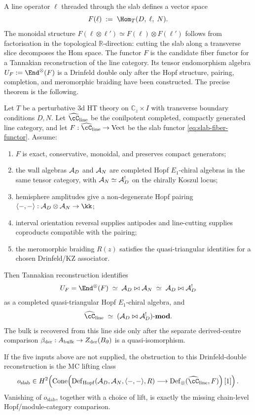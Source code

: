 A line operator $\ell$ threaded through the slab defines a vector
space
\begin{equation}\label{eq:slab-fiber-functor}
F(\ell) \;:=\; \Hom_T(D,\; \ell,\; N).
\end{equation}
The monoidal structure
$F(\ell \otimes \ell') \simeq F(\ell) \otimes F(\ell')$
follows from factorisation in the topological $\mathbb{R}$-direction:
cutting the slab along a transverse slice decomposes the Hom space.
The functor $F$ is the candidate fiber functor for a Tannakian
reconstruction of the line category. Its tensor endomorphism algebra
$U_F:=\End^\otimes(F)$ is a Drinfeld double only after the Hopf
structure, pairing, completion, and meromorphic braiding have been
constructed. The precise theorem is the following.

\begin{theorem}
\label{thm:slab-hopf-reconstruction}
Let $T$ be a perturbative $3$d HT theory on
$\mathbb C_z\times I$ with transverse boundary conditions $D,N$.
Let $\widehat{\cC}_{\mathrm{line}}$ be the conilpotent completed,
compactly generated line category, and let
$F:\widehat{\cC}_{\mathrm{line}}\to\mathrm{Vect}$ be the slab functor
\eqref{eq:slab-fiber-functor}. Assume:
\begin{enumerate}[label=\textup{(\roman*)},leftmargin=1.8em]
\item $F$ is exact, conservative, monoidal, and preserves compact
generators;
\item the wall algebras $\mathcal{A}_D$ and $\mathcal{A}_N$ are completed Hopf
$E_1$-chiral algebras in the same tensor category, with
$\mathcal{A}_N\simeq\mathcal{A}_D^!$ on the chirally Koszul locus;
\item hemisphere amplitudes give a non-degenerate Hopf pairing
$\langle-,-\rangle:\cA_D\otimes\cA_N\to\kk$;
\item interval orientation reversal supplies antipodes and line-cutting
supplies coproducts compatible with the pairing;
\item the meromorphic braiding $R(z)$ satisfies the quasi-triangular
identities for a chosen Drinfeld/KZ associator.
\end{enumerate}
Then Tannakian reconstruction identifies
\[
 U_F=\End^\otimes(F)
 \;\simeq\;
 \cA_D\bowtie\cA_N
 \;\simeq\;
 \cA_D\bowtie\cA_D^!
\]
as a completed quasi-triangular Hopf $E_1$-chiral algebra, and
\[
\widehat{\cC}_{\mathrm{line}}
\;\simeq\;
(\cA_D\bowtie\cA_D^!)\textup{-}\mathbf{mod}.
\]
The bulk is recovered from this line side only after the separate
derived-centre comparison
$\beta_{\mathrm{der}}:A_{\mathrm{bulk}}\to Z_{\mathrm{der}}(B_\partial)$ is a
quasi-isomorphism.

If the five inputs above are not supplied, the obstruction to this
Drinfeld-double reconstruction is the MC lifting class
\[
 o_{\mathrm{slab}}\in
 H^2\!\left(
 \operatorname{Cone}\!\left(
 \operatorname{Def}_{\mathrm{Hopf}}
   (\cA_D,\cA_N,\langle-,-\rangle,R)
 \longrightarrow
 \operatorname{Def}_{\otimes}
   (\widehat{\cC}_{\mathrm{line}},F)
 \right)[1]\right).
\]
Vanishing of $o_{\mathrm{slab}}$, together with a choice of lift, is
exactly the missing chain-level Hopf/module-category comparison.
\end{theorem}


